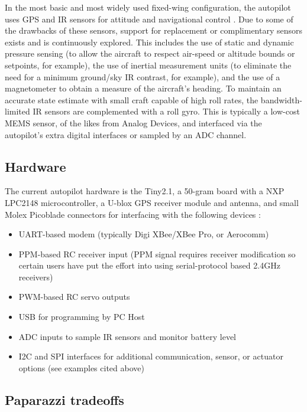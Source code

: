 \documentclass[a4paper,11pt]{report}
\begin{document}
In the most basic and most widely used fixed-wing configuration, the autopilot uses GPS and IR sensors for attitude and navigational control \cite{paparazzi_paper}. Due to some of the drawbacks of these sensors, support for replacement or complimentary sensors exists and is continuously explored. This includes the use of static and dynamic pressure sensing (to allow the aircraft to respect air-speed or altitude bounds or setpoints, for example), the use of inertial measurement units (to eliminate the need for a minimum ground/sky IR contrast, for example), and the use of a magnetometer to obtain a measure of the aircraft's heading. To maintain an accurate state estimate with small craft capable of high roll rates, the bandwidth-limited IR sensors are complemented with a roll gyro. This is typically a low-cost MEMS sensor, of the likes from Analog Devices, and interfaced via the autopilot's extra digital interfaces or sampled by an ADC channel.

\subsection{Hardware}

The current autopilot hardware is the Tiny2.1, a 50-gram board with a NXP LPC2148 microcontroller, a U-blox GPS receiver module and antenna, and small Molex Picoblade connectors for interfacing with the following devices :

\begin{itemize}
\item UART-based modem (typically Digi XBee/XBee Pro, or Aerocomm)
\item PPM-based RC receiver input (PPM signal requires receiver modification so certain users have put the effort into using serial-protocol based 2.4GHz receivers)
\item PWM-based RC servo outputs
\item USB for programming by PC Host
\item ADC inputs to sample IR sensors and monitor battery level
\item I2C and SPI interfaces for additional communication, sensor, or actuator options (see examples cited above)
\end{itemize}

\subsection{Paparazzi tradeoffs}
\end{document}
